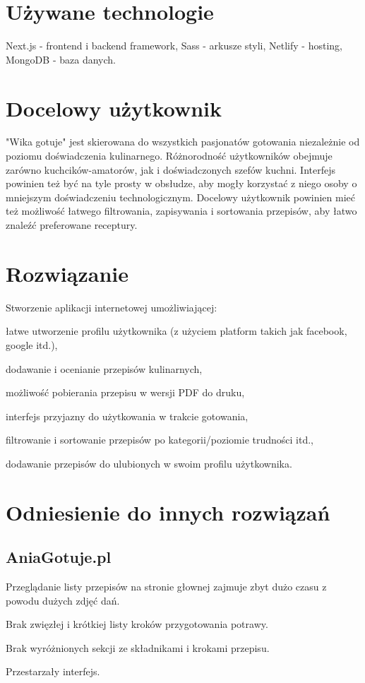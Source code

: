 \documentclass{article}
\newenvironment{itemize.zip}
{ \begin{itemize}
    \setlength{\itemsep}{0pt}
    \setlength{\parskip}{0pt}
    \setlength{\parsep}{0pt}     }
{ \end{itemize}                  }
\begin{document}
\section{Używane technologie}
      Next.js - frontend i backend framework,
      Sass - arkusze styli,
      Netlify - hosting,
      MongoDB - baza danych.

\section{Docelowy użytkownik}
"Wika gotuje" jest skierowana do wszystkich pasjonatów gotowania niezależnie od poziomu doświadczenia kulinarnego. Różnorodność użytkowników obejmuje zarówno kuchcików-amatorów, jak 
i doświadczonych szefów kuchni. Interfejs powinien też być na tyle prosty w obsłudze, aby mogły korzystać z niego osoby o mniejszym doświadczeniu technologicznym. 
\newline
Docelowy użytkownik powinien mieć też możliwość łatwego filtrowania, zapisywania i sortowania przepisów, aby łatwo znaleźć preferowane receptury.



\section{Rozwiązanie}
Stworzenie aplikacji internetowej umożliwiającej:
\begin{itemize.zip}
    \item łatwe utworzenie profilu użytkownika (z użyciem platform takich jak facebook, google itd.),
    \item dodawanie i ocenianie przepisów kulinarnych,
    \item możliwość pobierania przepisu w wersji PDF do druku,
    \item interfejs przyjazny do użytkowania w trakcie gotowania,
    \item filtrowanie i sortowanie przepisów po kategorii/poziomie trudności itd.,
    \item dodawanie przepisów do ulubionych w swoim profilu użytkownika.
\end{itemize.zip}

\section{Odniesienie do innych rozwiązań}
\subsection{AniaGotuje.pl}
\begin{itemize.zip}
    \item Przeglądanie listy przepisów na stronie głownej zajmuje zbyt dużo czasu z powodu dużych zdjęć dań.
    \item Brak zwięzłej i krótkiej listy kroków przygotowania potrawy.
    \item Brak wyróżnionych sekcji ze składnikami i krokami przepisu.
    \item Przestarzały interfejs.
\end{itemize.zip}
\end{document}
